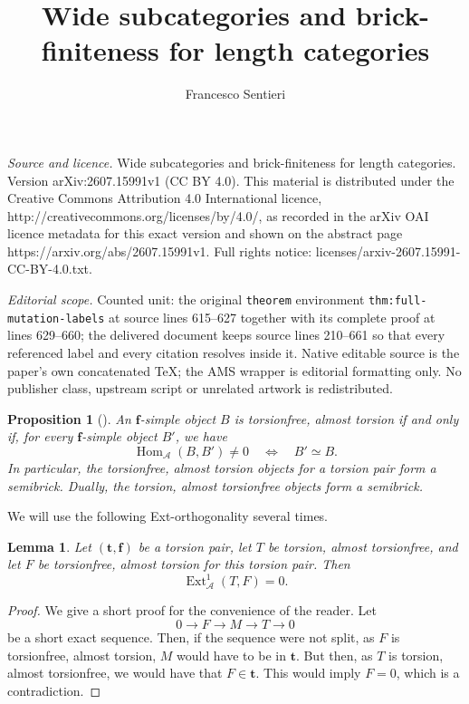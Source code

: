 \documentclass[10pt,a4paper]{amsart}
\newtheorem{proposition}[theorem]{Proposition}
\newtheorem{lemma}[theorem]{Lemma}
\newcommand{\A}{\mathcal A}
\newcommand{\Hom}{\operatorname{Hom}}
\newcommand{\Ext}{\operatorname{Ext}}
\begin{document}
\title[Wide subcategories and brick-finiteness for length categorie]{Wide subcategories and brick-finiteness for length categories}
\author{Francesco Sentieri}
\date{}
\maketitle
\noindent\emph{Source and licence.} Wide subcategories and brick-finiteness for length categories. Version arXiv:2607.15991v1 (CC BY 4.0). This material is distributed under the Creative Commons Attribution 4.0 International licence, http://creativecommons.org/licenses/by/4.0/, as recorded in the arXiv OAI licence metadata for this exact version and shown on the abstract page https://arxiv.org/abs/2607.15991v1. Full rights notice: licenses/arxiv-2607.15991-CC-BY-4.0.txt.\par\smallskip
\noindent\textit{Editorial scope.} Counted unit: the original \texttt{theorem} environment \texttt{thm:full-mutation-labels} at source lines 615--627 together with its complete proof at lines 629--660; the delivered document keeps source lines 210--661 so that every referenced label and every citation resolves inside it. Native editable source is the paper's own concatenated TeX; the AMS wrapper is editorial formatting only. No publisher class, upstream script or unrelated artwork is redistributed.
\begin{proposition}[{\cite[Lemma 4.4]{EnomotoMonobrick}}]\label{prop:maximal-f-simple}
An \(\mathbf f\)-simple object \(B\) is torsionfree, almost torsion if and only if, for every \(\mathbf f\)-simple object \(B'\), we have
\[
\Hom_\A(B,B')\neq 0
\quad\Longleftrightarrow\quad
B'\simeq B.
\]
In particular, the torsionfree, almost torsion objects for a torsion pair form a semibrick. Dually, the torsion, almost torsionfree objects form a semibrick.
\end{proposition}

We will use the following Ext-orthogonality several times. 

\begin{lemma}\label{lem:ext-orthogonality}
Let \((\mathbf t,\mathbf f)\) be a torsion pair, let \(T\) be torsion, almost torsionfree, and let \(F\) be torsionfree, almost torsion for this torsion pair. Then
\[
\Ext^1_\A(T,F)=0.
\]
\end{lemma}

\begin{proof}
We give a short proof for the convenience of the reader. Let 
\[
0 \to F \to M \to T \to 0
\]
be a short exact sequence. Then, if the sequence were not split, as $ F $ is torsionfree, almost torsion, $ M $ would have to be in $ \mathbf{t} $. But then, as $ T $ is torsion, almost torsionfree, we would have that $ F \in \mathbf{t} $. This would imply $ F = 0 $, which is a contradiction.
\end{proof}
\end{document}

